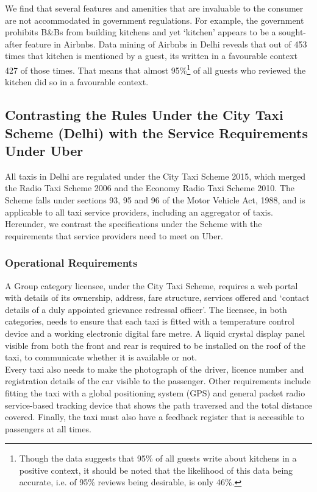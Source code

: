 \documentclass[a4paper, 12pt, twoside]{article}
\begin{document}
We find that several features and amenities that are invaluable to the consumer are not accommodated in government regulations. For example, the government prohibits B\&Bs from building kitchens and yet ‘kitchen’ appears to be a sought-after feature in Airbnbs. Data mining of Airbnbs in Delhi reveals that out of 453 times that kitchen is mentioned by a guest, its written in a favourable context 427 of those times. That means that almost 95\%\footnote {Though the data suggests that 95\% of all guests write about kitchens in a positive context, it should be noted that the likelihood of this data being accurate, i.e. of 95\% reviews being desirable, is only 46\%.} of all guests who reviewed the kitchen did so in a favourable context.

\newpage

\subsection{Contrasting the Rules Under the City Taxi Scheme (Delhi) with the Service Requirements Under Uber}
All taxis in Delhi are regulated under the City Taxi Scheme 2015, which merged the Radio Taxi Scheme 2006 and the Economy Radio Taxi Scheme 2010. The Scheme falls under sections 93, 95 and 96 of the Motor Vehicle Act, 1988, and is applicable to all taxi service providers, including an aggregator of taxis. Hereunder, we contrast the specifications under the Scheme with the requirements that service providers need to meet on Uber.

\subsubsection{Operational Requirements}
A Group category licensee, under the City Taxi Scheme, requires a web portal with details of its ownership, address, fare structure, services offered and ‘contact details of a duly appointed grievance redressal officer’. The licensee, in both categories, needs to ensure that each taxi is fitted with a temperature control device and a working electronic digital fare metre. A liquid crystal display panel visible from both the front and rear is required to be installed on the roof of the taxi, to communicate whether it is available or not. \\ 

Every taxi also needs to make the photograph of the driver, licence number and registration details of the car visible to the passenger. Other requirements include fitting the taxi with a global positioning system (GPS) and general packet radio service-based tracking device that shows the path traversed and the total distance covered. Finally, the taxi must also have a feedback register that is accessible to passengers at all times.\\
\end{document}
